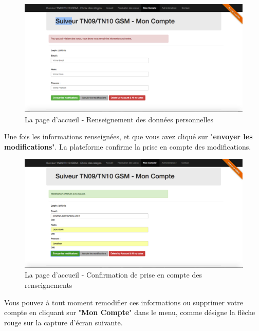\documentclass[a4paper,titlepage]{scrartcl}
\begin{document}
\begin{figure}[H]
	\vspace{-3mm}
	\begin{center}
		\includegraphics[scale=0.3]{Images/personal_infos.png}
		\caption{La page d'accueil - Renseignement des données personnelles}
	\end{center}
\end{figure}

Une fois les informations renseignées, et que vous avez cliqué sur "\textbf{envoyer les modifications}". La plateforme confirme la prise en compte des modifications.

\begin{figure}[H]
	\vspace{-3mm}
	\begin{center}
		\includegraphics[scale=0.3]{Images/personal_infos_OK.png}
		\caption{La page d'accueil - Confirmation de prise en compte des renseignements}
	\end{center}
\end{figure}


Vous pouvez à tout moment remodifier ces informations ou supprimer votre compte en cliquant sur "\textbf{Mon Compte}" dans le menu, comme désigne la flèche rouge sur la capture d'écran suivante.\\
\end{document}
